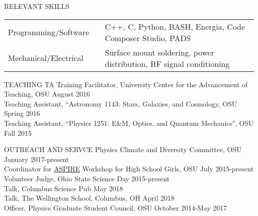\documentclass{resume} %
\begin{document}
\begin{rSection}{RELEVANT SKILLS}
\begin{tabular}{@{}l l l@{}}
 Programming/Software & & C++, C, Python, BASH, Energia, Code Composer Studio, PADS \\ 
 Mechanical/Electrical & & Surface mount soldering, power distribution, RF signal conditioning  \\ 
\end{tabular}
\end{rSection}

\begin{rSection}{TEACHING}
TA Training Facilitator, University Center for the Advancement of Teaching, OSU \hfill {August 2016}\\
Teaching Assistant, ``Astronomy 1143: Stars, Galaxies, and Cosmology, OSU \hfill {Spring 2016}\\
Teaching Assistant, ``Physics 1251: E\&M, Optics, and Quantum Mechanics", OSU \hfill {Fall 2015}\\
\end{rSection}
\vspace{-0.35cm}

\begin{rSection}{OUTREACH AND SERVCE}
Physics Climate and Diversity Committee, OSU \hfill January 2017-present\\
Coordinator for \href{u.osu.edu/aspire}{ASPIRE} Workshop for High School Girls, OSU \hfill July 2015-present\\
Volunteer Judge, Ohio State Science Day \hfill 2015-present\\
Talk, Columbus Science Pub \hfill  May 2018\\
Talk, The Wellington School, Columbus, OH \hfill April 2018\\
Officer, Physics Graduate Student Council, OSU \hfill October 2014-May 2017 \\
\end{rSection}
\vspace{-0.30cm}
\end{document}
